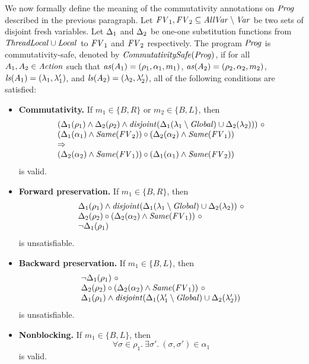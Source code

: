 We now formally define the meaning of the commutativity annotations on $\mathit{Prog}$ described in the previous paragraph.
Let $\mathit{FV}_1,\mathit{FV}_2 \subseteq \mathit{AllVar} \setminus \mathit{Var}$ be two sets of disjoint fresh variables.
Let $\Delta_1$ and $\Delta_2$ be one-one 
substitution functions from $\mathit{ThreadLocal} \cup \mathit{Local}$ to $\mathit{FV}_1$ and $\mathit{FV}_2$ respectively.
The program $\mathit{Prog}$ is commutativity-safe, denoted by $\mathit{CommutativitySafe}(\mathit{Prog})$,
if for all $A_1,A_2 \in \mathit{Action}$ such that $\mathit{as}(A_1) = (\rho_1,\alpha_1,m_1)$, $\mathit{as}(A_2) = (\rho_2,\alpha_2,m_2)$,
$\mathit{ls}(A_1) = (\lambda_1,\lambda'_1)$, and $\mathit{ls}(A_2) = (\lambda_2,\lambda'_2)$, 
all of the following conditions are satisfied:
\begin{itemize}
\item {\bf Commutativity.}
If $m_1 \in \{B,R\}$ or $m_2 \in \{B,L\}$, then 
\[
\begin{array}{l}
(\Subst_1(\rho_1) \wedge \Subst_2(\rho_2) \wedge \disjoint(\Subst_1(\lins_1 \setminus \Global) \cup \Subst_2(\lins_2)))\ \circ \\
(\Subst_1(\alpha_1) \wedge \Same(\FV_2)) \circ (\Subst_2(\alpha_2) \wedge \Same(\FV_1)) \\ 
\Rightarrow \\
(\Subst_2(\alpha_2) \wedge \Same(\FV_1)) \circ (\Subst_1(\alpha_1) \wedge \Same(\FV_2))
\end{array}
\]
is valid.
\item {\bf Forward preservation.}
If $m_1 \in \{B,R\}$, then 
\[
\begin{array}{l}
\Delta_1(\rho_1) \wedge \mathit{disjoint}(\Delta_1(\lambda_1 \setminus \mathit{Global}) \cup \Delta_2(\lambda_2))\ \circ \\
\Delta_2(\rho_2) \circ (\Delta_2(\alpha_2) \wedge \mathit{Same}(\mathit{FV}_1))\ \circ \\
\neg \Delta_1(\rho_1)
\end{array}
\]
is unsatisfiable.
\item {\bf Backward preservation.}
If $m_1 \in \{B,L\}$, then 
\[
\begin{array}{l}
\neg \Delta_1(\rho_1)\ \circ \\
\Delta_2(\rho_2) \circ (\Delta_2(\alpha_2) \wedge \mathit{Same}(\mathit{FV}_1))\ \circ \\
\Delta_1(\rho_1) \wedge \mathit{disjoint}(\Delta_1(\lambda'_1 \setminus \mathit{Global}) \cup \Delta_2(\lambda'_2))
\end{array}
\]
is unsatisfiable.
\item {\bf Nonblocking.}
If $m_1 \in \{B, L\}$, then
\[
\forall \sigma \in \rho_1.\ \exists \sigma'.\ (\sigma, \sigma') \in \alpha_1
\]
is valid.
\end{itemize}

